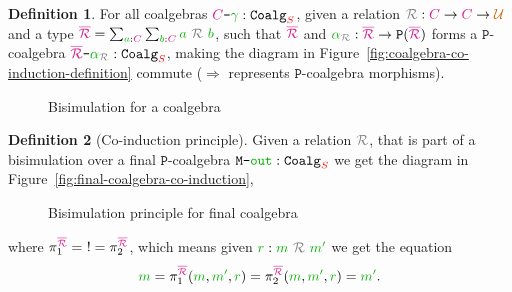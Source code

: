 \documentclass[twoside,11pt,openright]{report}
\theoremstyle{plain} %
\theoremstyle{definition}
\newtheorem{defn}{Definition}[section]
\theoremstyle{remark}
\newcommand*{\figref}[1]{Figure~\ref{fig:#1}}
\newcommand*{\term}[1]{\textcolor{green!70!black}{#1}} %
\newcommand*{\type}[1]{\textcolor{magenta!90!black}{#1}}
\newcommand*{\container}[1]{\textcolor{red}{#1}}
\newcommand*{\universe}[1]{\textcolor{orange!80!black}{#1}}
\newcommand*{\coalg}[2]{#1\texttt{-}#2}
\newcommand*{\relation}[1]{\textcolor{gray}{\ensuremath{\mathtt{#1}}}}
\newcommand*{\function}[1]{\textcolor{blue!60!black}{\ensuremath{\mathtt{#1}}}}
\newcommand*{\typeformer}[1]{\ensuremath{\mathtt{#1}}}
\newcommand*{\functor}[1]{\ensuremath{\mathbf{\mathtt{#1}}}}
\begin{document}
\begin{defn}
  For all coalgebras \(\coalg{\type{C}}{\term{\gamma}} : \typeformer{Coalg}_{\container{S}}\), given a relation \(\relation{\mathcal{R}} : \type{C} \rightarrow \type{C} \rightarrow \universe{\mathcal{U}}\) and a type \(\type{\overline{\mathcal{R}}} = \sum_{\term{a} : \type{C}} \sum_{\term{b} : \type{C}} \term{a}~\relation{\mathcal{R}}~\term{b}\), such that \(\type{\overline{\mathcal{R}}}\) and \(\term{\alpha}_{\relation{\mathcal{R}}} : \type{\overline{\mathcal{R}}} \rightarrow \functor{P}(\type{\overline{\mathcal{R}}})\) forms a \(\functor{P}\)-coalgebra \(\coalg{\type{\overline{\mathcal{R}}}}{\term{\alpha}_{\relation{\mathcal{R}}}} : \mathtt{Coalg}_{\container{S}}\), making the diagram in \figref{coalgebra-co-induction-definition} commute (\(\Longrightarrow\) represents \(\functor{P}\)-coalgebra morphisms).  
  \begin{figure}[h]
    \centering
    \caption{Bisimulation for a coalgebra}
    \label{fig:coalgebra-coinduction-definition}
  \end{figure}
\end{defn}
\begin{defn}[Co-induction principle]
  \noindent Given a relation \(\relation{\mathcal{R}}\), that is part of a bisimulation over a final \(\functor{P}\)-coalgebra \(\coalg{\typeformer{M}}{\term{\mathtt{out}}}:\mathtt{Coalg}_{\container{S}}\) we get the diagram in \figref{final-coalgebra-co-induction},
  
  \begin{figure}[h]
    \centering
    \caption{Bisimulation principle for final coalgebra}
    \label{fig:final-coalgebra-coinduction}
  \end{figure}
  \noindent where \(\pi_1^{\type{\overline{\mathcal{R}}}} = ~! = \pi_2^{\type{\overline{\mathcal{R}}}}\), which means given \(\term{r} : \term{m}~\relation{\mathcal{R}}~\term{m'}\) we get the equation
  \begin{equation}
    \term{m} = \pi_1^{\type{\overline{\mathcal{R}}}} (\term{m}, \term{m'}, \term{r}) = \pi_2^{\type{\overline{\mathcal{R}}}} (\term{m}, \term{m'}, \term{r}) = \term{m'}.
  \end{equation}
\end{defn}
\end{document}
